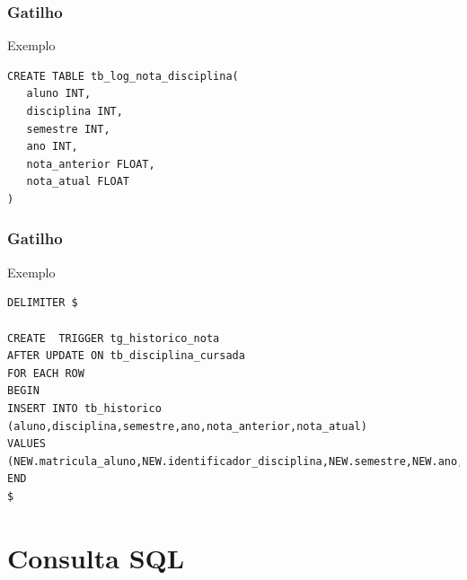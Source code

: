 \documentclass{beamer}
\begin{document}
\begin{frame}[fragile]
\frametitle{Gatilho}

\begin{exampleblock}{Exemplo}
	\begin{lstlisting}
CREATE TABLE tb_log_nota_disciplina(
   aluno INT,
   disciplina INT,
   semestre INT,
   ano INT,
   nota_anterior FLOAT,
   nota_atual FLOAT
)
	\end{lstlisting}
\end{exampleblock}
\end{frame}

\begin{frame}[fragile]
\frametitle{Gatilho}

\begin{exampleblock}{Exemplo}
	\begin{lstlisting}
DELIMITER $

CREATE  TRIGGER tg_historico_nota 
AFTER UPDATE ON tb_disciplina_cursada 
FOR EACH ROW 
BEGIN 
INSERT INTO tb_historico (aluno,disciplina,semestre,ano,nota_anterior,nota_atual) 
VALUES
(NEW.matricula_aluno,NEW.identificador_disciplina,NEW.semestre,NEW.ano,OLD.nota,NEW.nota); 
END
$
	\end{lstlisting}
\end{exampleblock}
\end{frame}

\section{Consulta SQL}
\end{document}
